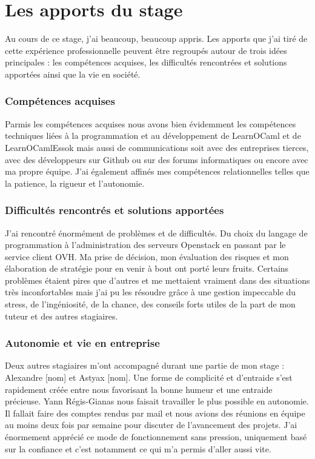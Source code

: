 \documentclass{article}
\begin{document}
\newpage

\section{Les apports du stage}
Au cours de ce stage, j’ai beaucoup, beaucoup appris. Les apports que j’ai tiré de cette expérience professionnelle peuvent être regroupés autour de trois idées principales : les compétences acquises, les difficultés rencontrées et solutions apportées ainsi que la vie en société.
\subsubsection{Compétences acquises}

Parmis les compétences acquises nous avons bien évidemment les compétences techniques liées à la programmation et au développement de LearnOCaml et de LearnOCamlEssok mais aussi de communications soit avec des entreprises tierces, avec des développeurs sur Github ou sur des forums informatiques ou encore avec ma propre équipe.
\newline
J'ai également affinés mes compétences relationnelles telles que la patience, la rigueur et l'autonomie.

\subsubsection{Difficultés rencontrés et solutions apportées}

J'ai rencontré énormément de problèmes et de difficultés. Du choix du langage de programmation à l'administration des serveurs Openstack en passant par le service client OVH.
\newline
Ma prise de décision, mon évaluation des risques et mon élaboration de stratégie pour en venir à bout ont porté leurs fruits. Certains problèmes étaient pires que d'autres et me mettaient vraiment dans des situations très inconfortables mais j'ai pu les résoudre grâce à une gestion impeccable du stress, de l'ingéniosité, de la chance, des conseils forts utiles de la part de mon tuteur et des autres stagiaires.

\subsubsection{Autonomie et vie en entreprise}

Deux autres stagiaires m'ont accompagné durant une partie de mon stage : Alexandre [nom] et Astyax [nom].
\newline
Une forme de complicité et d'entraide s'est rapidement créée entre nous favorisant la bonne humeur et une entraide précieuse.
\newline
Yann Régis-Gianas nous faisait travailler le plus possible en autonomie. Il fallait faire des comptes rendus par mail et nous avions des réunions en équipe au moins deux fois par semaine pour discuter de l'avancement des projets.
\newline
J'ai énormement apprécié ce mode de fonctionnement sans pression, uniquement basé sur la confiance et c'est notamment ce qui m'a permis d'aller aussi vite.
\end{document}
